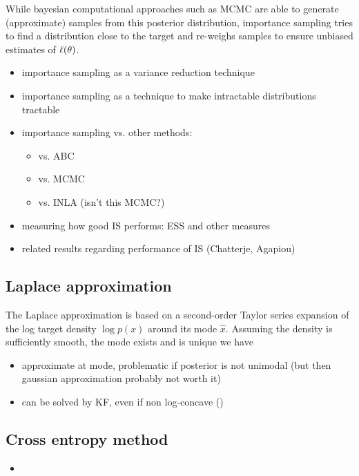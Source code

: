While bayesian computational approaches such as MCMC are able to generate (approximate) samples from this posterior distribution, importance sampling tries to find a distribution close to the target and re-weighs samples to ensure unbiased estimates of $\ell(\theta)$.

\begin{itemize}
    \item importance sampling as a variance reduction technique
    \item importance sampling as a technique to make intractable distributions tractable
    \item importance sampling vs. other methods:
          \begin{itemize}
              \item vs. ABC
              \item vs. MCMC
              \item vs. INLA (isn't this MCMC?)
          \end{itemize}
    \item measuring how good IS performs: ESS and other measures
    \item related results regarding performance of IS (Chatterje, Agapiou)
\end{itemize}

\subsection{Laplace approximation}

The Laplace approximation is based on a second-order Taylor series expansion of the log target density $\log p(x)$ around its mode $\hat x$. Assuming the density is sufficiently smooth, the mode exists and is unique we have

\begin{itemize}
    \item approximate at mode, problematic if posterior is not unimodal (but then gaussian approximation probably not worth it)
    \item can be solved by KF, even if non log-concave ()
\end{itemize}
\subsection{Cross entropy method}
\begin{itemize}
    \item
\end{itemize}
